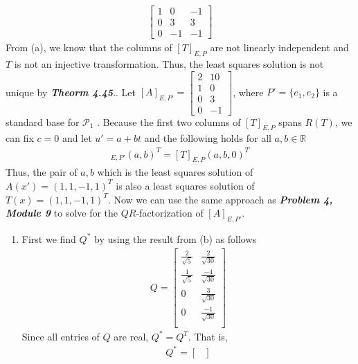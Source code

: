 \documentclass{uofa-eng-assignment}
\begin{document}
\begin{enumerate}
\begin{enumerate}
\begin{align*}
\begin{bmatrix}
	      	      	1 & 0  & -1 \\
	      	      	0 & 3  & 3  \\
	      	      	0 & -1 & -1 
	      	      	\end{bmatrix}
	      	      \end{align*}
	      	      From (a), we know that the columns of $[T]_{E, P}$ are not linearly independent and $T$ is not an injective transformation. Thus, the least squares solution is not unique by \textbf{\textit{Theorm 4.45}}.. Let $[A]_{E, P'} = \begin{bmatrix}
	      	      2 &10 \\ 1 &0 \\ 0 &3 \\ 0 &-1
	      	\end{bmatrix}$, where $P' = \{e_1, e_2 \}$ is a standard base for $\mathcal{P}_1$ .  Because the first two columns of $[T]_{E, P}$ spans $R(T)$, we can fix $c = 0 $ and let $u' = a + bt$ and the following holds for all $a, b \in \mathbb{R}$
	      	\begin{align*}
	      		[A]_{E, P'}(a, b)^T = [T]_{E, P}(a, b, 0)^T 
	      	\end{align*}
	      	Thus, the pair of $a, b$ which is the least squares solution of $A(x') = (1, 1, -1, 1)^T$ is also a least squares solution of $T(x) = (1, 1, -1, 1)^T$. Now we can use the same approach as \textbf{\textit{Problem 4, Module 9}} to solve for the $QR$-factorization of $[A]_{E, P'}$. \\
	      	\begin{enumerate}
	      		\item First we find $Q^*$ by using the result from (b) as follows            
	      		      \begin{align*}
	      		      	Q = \begin{bmatrix}
	      		      	\frac{2}{\sqrt{5}} & \frac{2}{\sqrt{30}}  \\
	      		      	\frac{1}{\sqrt{5}} & \frac{-4}{\sqrt{30}} \\
	      		      	0                  & \frac{3}{\sqrt{30}}  \\
	      		      	0                  & \frac{-1}{\sqrt{30}} \\
	      		      	\end{bmatrix}
	      		      \end{align*}
	      		      Since all entries of $Q$ are real, $Q^* = Q^T$. That is,
	      		      \begin{align*}
	      		      	Q^* = \begin{bmatrix}

\end{bmatrix}
\end{align*}
\end{enumerate}
\end{enumerate}
\end{enumerate}
\end{document}
